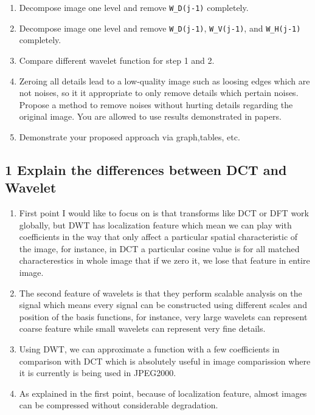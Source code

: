 \documentclass[11pt]{article}
\providecommand{\tightlist}{%
      \setlength{\itemsep}{0pt}\setlength{\parskip}{0pt}}
\begin{document}
\begin{enumerate}
  \begin{enumerate}
  \def\labelenumii{\arabic{enumii}.}
  \tightlist
  \item
    Decompose image one level and remove \texttt{W\_D(j-1)} completely.
  \item
    Decompose image one level and remove \texttt{W\_D(j-1)},
    \texttt{W\_V(j-1)}, and \texttt{W\_H(j-1)} completely.
  \item
    Compare different wavelet function for step 1 and 2.
  \item
    Zeroing all details lead to a low-quality image such as loosing
    edges which are not noises, so it it appropriate to only remove
    details which pertain noises. Propose a method to remove noises
    without hurting details regarding the original image. You are
    allowed to use results demonstrated in papers.
  \item
    Demonstrate your proposed approach via graph,tables, etc.
  \end{enumerate}
\end{enumerate}

    \hypertarget{explain-the-differences-between-dct-and-wavelet}{%
\subsection{1 Explain the differences between DCT and
Wavelet}\label{explain-the-differences-between-dct-and-wavelet}}

\begin{enumerate}
\def\labelenumi{\arabic{enumi}.}
\item
  First point I would like to focus on is that transforms like DCT or
  DFT work globally, but DWT has localization feature which mean we can
  play with coefficients in the way that only affect a particular
  spatial characteristic of the image, for instance, in DCT a particular
  cosine value is for all matched characterestics in whole image that if
  we zero it, we lose that feature in entire image.
\item
  The second feature of wavelets is that they perform scalable analysis
  on the signal which means every signal can be constructed using
  different scales and position of the basis functions, for instance,
  very large wavelets can represent coarse feature while small wavelets
  can represent very fine details.
\item
  Using DWT, we can approximate a function with a few coefficients in
  comparison with DCT which is absolutely useful in image comparission
  where it is currently is being used in JPEG2000.
\item
  As explained in the first point, because of localization feature,
  almost images can be compressed without considerable degradation.
\end{enumerate}
\end{document}
